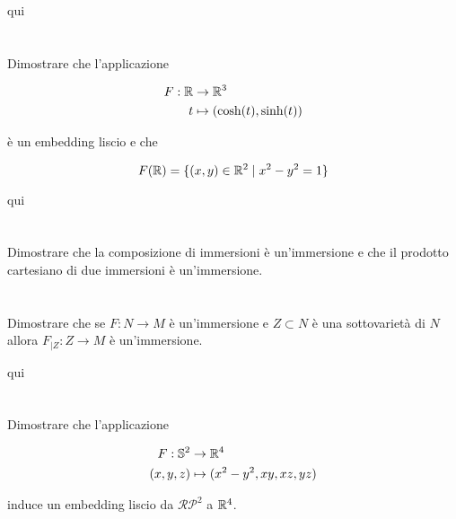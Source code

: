 qui

\tocless\section{}\label{es2-20}

\begin{tcolorbox}
	Dimostrare che l'applicazione
	
	\begin{align}
		\begin{split}
			F : \mathbb{R} &\to \mathbb{R}^{3}\\
			t &\mapsto (\cosh(t),\sinh(t))
		\end{split}
	\end{align}
	
	è un embedding liscio e che
	
	\begin{equation}
		F(\mathbb{R}) = \{ (x,y) \in \mathbb{R}^{2} \mid x^{2}-y^{2} = 1 \}
	\end{equation}
\end{tcolorbox}

qui

\tocless\section{}\label{es2-21}

\begin{tcolorbox}
	Dimostrare che la composizione di immersioni è un’immersione e che il prodotto cartesiano di due immersioni è un’immersione.
\end{tcolorbox}



\tocless\section{}\label{es2-22}

\begin{tcolorbox}
	Dimostrare che se $ F : N \to M $ è un'immersione e $ Z \subset N $ è una sottovarietà di $ N $ allora $ F_{|Z} : Z \to M $ è un'immersione.
\end{tcolorbox}

qui

\tocless\section{}\label{es2-23}

\begin{tcolorbox}
	Dimostrare che l'applicazione
	
	\begin{align}
		\begin{split}
			F : \mathbb{S}^{2} &\to \mathbb{R}^{4}\\
			(x,y,z) &\mapsto (x^{2}-y^{2},xy,xz,yz)
		\end{split}
	\end{align}
	
	induce un embedding liscio da $ \mathcal{RP}^{2} $ a $ \mathbb{R}^{4} $.
\end{tcolorbox}

